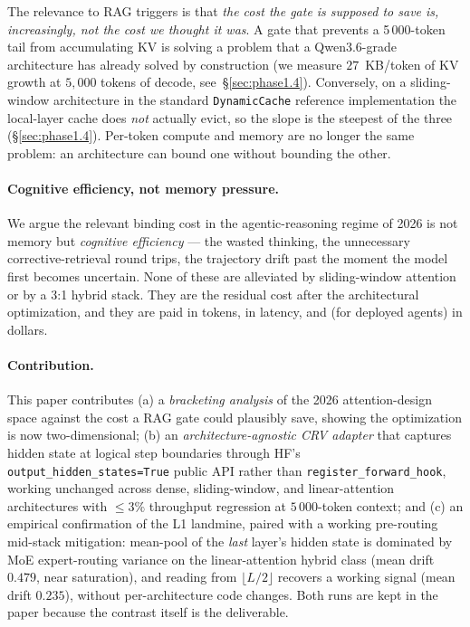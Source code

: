 \documentclass[11pt,letterpaper]{article}
\begin{document}
The relevance to RAG triggers is that \emph{the cost the gate is
supposed to save is, increasingly, not the cost we thought it was}. A
gate that prevents a 5\,000-token tail from accumulating KV is solving a
problem that a Qwen3.6-grade architecture has already solved by
construction (we measure $27$~KB/token of KV growth at $5{,}000$ tokens
of decode, see~\S\ref{sec:phase1.4}). Conversely, on a
sliding-window architecture in the standard \texttt{DynamicCache}
reference implementation the local-layer cache does \emph{not} actually
evict, so the slope is the steepest of the three (\S\ref{sec:phase1.4}).
Per-token compute and memory are no longer the same problem: an
architecture can bound one without bounding the other.

\paragraph{Cognitive efficiency, not memory pressure.}
We argue the relevant binding cost in the agentic-reasoning regime of
2026 is not memory but \emph{cognitive efficiency} —
the wasted thinking, the unnecessary corrective-retrieval round trips, the
trajectory drift past the moment the model first becomes uncertain.
None of these are alleviated by sliding-window attention or by a 3:1
hybrid stack. They are the residual cost after the architectural
optimization, and they are paid in tokens, in latency, and (for
deployed agents) in dollars.

\paragraph{Contribution.}
This paper contributes (a) a \emph{bracketing analysis} of the 2026
attention-design space against the cost a RAG gate could plausibly save,
showing the optimization is now two-dimensional;
(b) an \emph{architecture-agnostic CRV adapter} that captures hidden
state at logical step boundaries through HF's
\verb|output_hidden_states=True| public API rather than
\verb|register_forward_hook|, working unchanged across dense,
sliding-window, and linear-attention architectures with
$\le 3\%$ throughput regression at $5\,000$-token context; and
(c) an empirical confirmation of the L1 landmine, paired with a
working pre-routing mid-stack mitigation: mean-pool of the
\emph{last} layer's hidden state is dominated by MoE expert-routing
variance on the linear-attention hybrid class
(mean drift $0.479$, near saturation), and reading from
$\lfloor L/2\rfloor$ recovers a working signal (mean drift $0.235$),
without per-architecture code changes. Both runs are kept in the paper
because the contrast itself is the deliverable.
\end{document}
